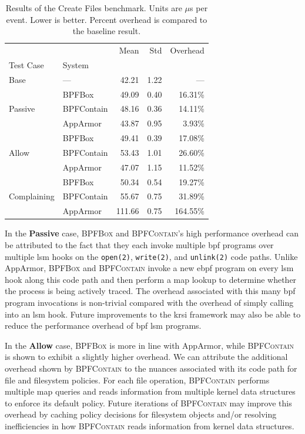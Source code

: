\documentclass[
  fontsize=12pt,
  titlepage=firstiscover,
  paper=letter,
oneside,
  cleardoublepage=plain,
  parskip=half-,
  DIV=10,
  parindent,
  appendixprefix,
  chapterprefix,
  listof=totoc,
]{scrbook}
\newcommand{\bpfbox}{\textsc{BPFBox}}
\newcommand{\bpfcontain}{\textsc{BPFContain}}
\begin{document}
\begin{table}[ht!]
\centering
\footnotesize
\caption[Results of the Create Files benchmark]{Results of the Create Files benchmark. Units are $\mu$s per event. Lower is better. Percent overhead is compared to the baseline result.}
\label{tab:phoronix-create-files}
\begin{tabular}{llrrr}
\toprule
            &          &    Mean &   Std &  Overhead \\
Test Case & System &         &       &           \\
\midrule
Base & --- &   42.21 &  1.22 &       --- \\
\cline{1-5}
\multirow{3}{*}{Passive} & BPFBox &   49.09 &  0.40 &   16.31\% \\
            & BPFContain &   48.16 &  0.36 &   14.11\% \\
            & AppArmor &   43.87 &  0.95 &    3.93\% \\
\cline{1-5}
\multirow{3}{*}{Allow} & BPFBox &   49.41 &  0.39 &   17.08\% \\
            & BPFContain &   53.43 &  1.01 &   26.60\% \\
            & AppArmor &   47.07 &  1.15 &   11.52\% \\
\cline{1-5}
\multirow{3}{*}{Complaining} & BPFBox &   50.34 &  0.54 &   19.27\% \\
            & BPFContain &   55.67 &  0.75 &   31.89\% \\
            & AppArmor &  111.66 &  0.75 &  164.55\% \\
\bottomrule
\end{tabular}
\end{table}
 

In the \textbf{Passive} case, \bpfbox{} and \bpfcontain{}'s high performance overhead can
be attributed to the fact that they each invoke multiple \gls{bpf} programs over multiple
\gls{lsm} hooks on the \texttt{open(2)}, \texttt{write(2)}, and \texttt{unlink(2)} code
paths. Unlike AppArmor, \bpfbox{} and \bpfcontain{} invoke a new \gls{ebpf} program on
every \gls{lsm} hook along this code path and then perform a map lookup to determine whether
the process is being actively traced. The overhead associated with this many \gls{bpf}
program invocations is non-trivial compared with the overhead of simply calling into an
\gls{lsm} hook. Future improvements to the \gls{krsi} framework may also be able to reduce
the performance overhead of \gls{bpf} \gls{lsm} programs.

In the \textbf{Allow} case, \bpfbox{} is more in line with AppArmor, while \bpfcontain{}
is shown to exhibit a slightly higher overhead. We can attribute the additional
overhead shown by \bpfcontain{} to the nuances associated with its code path for file and
filesystem policies. For each file operation, \bpfcontain{} performs multiple map queries
and reads information from multiple kernel data structures to enforce its default policy.
Future iterations of \bpfcontain{} may improve this overhead by caching policy decisions
for filesystem objects and/or resolving inefficiencies in how \bpfcontain{} reads
information from kernel data structures.
\end{document}
